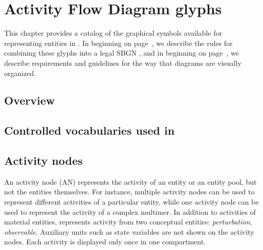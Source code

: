 \chapter{Activity Flow Diagram glyphs}


This chapter provides a catalog of the graphical symbols available for representing entities in \AFs. In  beginning on page~\pageref{chp:af:grammar}, we describe the rules for combining these glyphs into a legal SBGN \AF, and in  beginning on page~\pageref{chp:af:layout}, we describe requirements and guidelines for the way that diagrams are visually organized.

\section{Overview}



\section{Controlled vocabularies used in \SBGNAFLone}\label{af:sec:CVs}




\section{Activity nodes}\label{sec:af:ANs}

An activity node (AN) represents the activity of an entity or an entity pool, but not the entities themselves. For instance, multiple activity nodes can be used to represent different activities of a particular entity, while one activity node can be used to represent the activity of a complex multimer.
In addition to activities of material entities, \SBGNAFLone represents activity from two conceptual entities: \emph{perturbation}, \emph{observable}.  Auxiliary units such as state variables are not shown on the activity nodes.  Each activity is displayed only once in one compartment.



